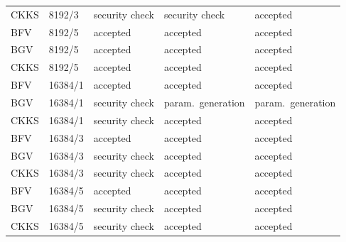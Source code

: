 \begin{longtable}{@{}lllll@{}}
CKKS & 8192/3 & security check & security check & accepted \\
BFV & 8192/5 & accepted & accepted & accepted \\
BGV & 8192/5 & accepted & accepted & accepted \\
CKKS & 8192/5 & accepted & accepted & accepted \\
BFV & 16384/1 & accepted & accepted & accepted \\
BGV & 16384/1 & security check & param.\ generation & param.\ generation \\
CKKS & 16384/1 & security check & accepted & accepted \\
BFV & 16384/3 & accepted & accepted & accepted \\
BGV & 16384/3 & security check & accepted & accepted \\
CKKS & 16384/3 & security check & accepted & accepted \\
BFV & 16384/5 & accepted & accepted & accepted \\
BGV & 16384/5 & security check & accepted & accepted \\
CKKS & 16384/5 & security check & accepted & accepted \\
\bottomrule
\end{longtable}
